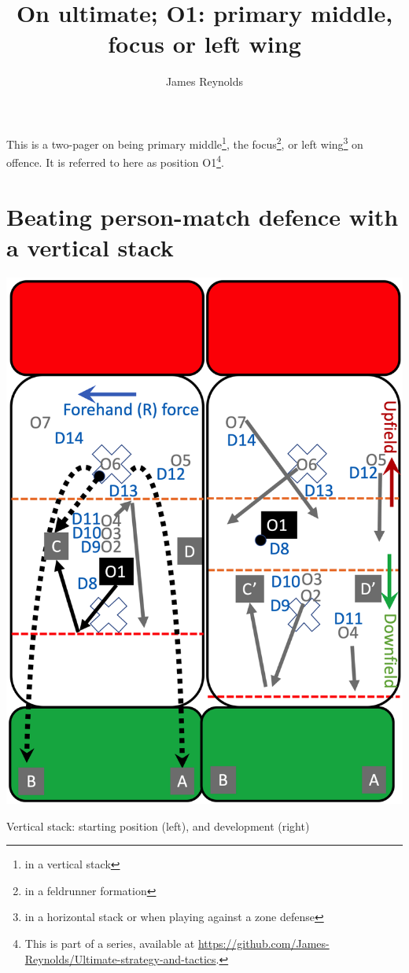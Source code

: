 \documentclass{tufte-handout}
\title{On ultimate; O1: primary middle, focus or left wing}
\author[James Reynolds]{James Reynolds}
\begin{document}
\maketitle%



This is 
a two-pager 
on being 
primary middle\footnote{in a vertical stack}, 
the focus\footnote{in a feldrunner formation}, 
or left wing\footnote{in a horizontal stack 
or when playing against a zone defense}
on offence. 
It is  
referred to here 
as position O1\footnote{
This
is part of a series, 
available at
\url{https://github.com/James-Reynolds/Ultimate-strategy-and-tactics}.}.


\section{Beating person-match defence with a vertical stack}\label{sec:vertical}

\begin{marginfigure}%
  \includegraphics[width=\linewidth]{O1-vertical}
  \caption{Vertical stack: 
  starting position (left),
  and development (right)}
  \label{fig:O1-vertical}
\end{marginfigure}
\end{document}
